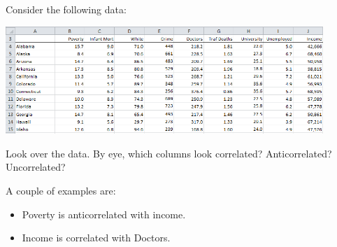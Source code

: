 Consider the following data: 

\begin{center}
    \includegraphics[width=0.9\textwidth]{img/e1p1.png}
\end{center}

Look over the data. By eye, which columns look correlated? Anticorrelated? Uncorrelated?

\begin{solution}
    A couple of examples are:
    \begin{itemize}
        \item Poverty is anticorrelated with income.
        \item Income is correlated with Doctors.
    \end{itemize}
\end{solution}
